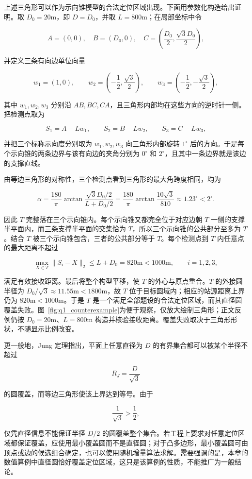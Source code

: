 上述三角形可以作为示向锥模型的合法定位区域出现。下面用参数化构造给出证明。取 $D_0=20\mathrm{m}$，即 $D=D_0$，并取 $L=800\mathrm{m}$；在局部坐标中令

\[
A=(0,0),\quad B=(D_0,0),\quad C=\left(\frac{D_0}{2},\frac{\sqrt3D_0}{2}\right),
\]

并定义三条有向边单位向量

\[
w_1=(1,0),\qquad
w_2=\left(-\frac12,\frac{\sqrt3}{2}\right),\qquad
w_3=\left(-\frac12,-\frac{\sqrt3}{2}\right),
\]

其中 $w_1,w_2,w_3$ 分别沿 $AB,BC,CA$，且三角形内部均在这些方向的逆时针一侧。把检测点取为

\[
S_1=A-Lw_1,\qquad S_2=B-Lw_2,\qquad S_3=C-Lw_3,
\]

并把三个标称示向度分别取为 $w_1,w_2,w_3$ 向三角形内部旋转 $1^\circ$ 后的方向。于是每个示向锥的两条边界与该有向边的夹角分别为 $0^\circ$ 和 $2^\circ$，且其中一条边界就是该边的支撑直线。

由等边三角形的对称性，三个检测点看到三角形的最大角跨度相同，均为

\[
\alpha=\frac{180}{\pi}\arctan\frac{\sqrt3D_0/2}{L+D_0/2}
=\frac{180}{\pi}\arctan\frac{10\sqrt3}{810}
\approx1.23^\circ<2^\circ.
\]

因此 $T$ 完整落在三个示向锥内。每个示向锥又都完全位于对应边朝 $T$ 一侧的支撑半平面内，而三条支撑半平面的交集恰为 $T$，所以三个示向锥的公共部分至多为 $T$。结合 $T$ 被三个示向锥包含，三者的公共部分等于 $T$。每个检测点到 $T$ 内任意点的最大距离不超过

\[
\max_{X\in T}\lVert S_i-X\rVert_2\le L+D_0
=820\mathrm{m}<1000\mathrm{m},\qquad i=1,2,3,
\]

满足有效接收距离。最后将整个构型平移，使 $T$ 的外心与原点重合。$T$ 的外接圆半径为 $D_0/\sqrt3\approx11.55\mathrm{m}<1800\mathrm{m}$，故 $T$ 位于目标圆域内；相应的站源距离上界仍为 $820\mathrm{m}<1000\mathrm{m}$。于是 $T$ 是一个满足全部题设的合法定位区域，而其直径圆覆盖失败。图~\ref{fig:q1_counterexample}为便于观察，仅放大绘制三角形；正文反例仍按 $D_0=20\mathrm{m}$、$L=800\mathrm{m}$ 构造并核验接收距离。覆盖失败取决于三角形形状，不随显示比例改变。

更一般地，Jung 定理指出，平面上任意直径为 $D$ 的有界集合都可以被某个半径不超过

\[
R_J=\frac{D}{\sqrt3}
\]

的圆覆盖，而等边三角形使该上界达到等号\cite{jung1901}。由于

\[
\frac{1}{\sqrt3}>\frac12,
\]

仅凭直径信息不能保证半径 $D/2$ 的圆覆盖整个集合。若工程上要求对任意定位区域都保证覆盖，应使用最小覆盖圆而不是直径圆；对于凸多边形，最小覆盖圆可由顶点或边的候选组合确定，也可以使用随机增量算法求解。需要强调的是，本章的数值算例中直径圆恰好覆盖定位区域，这只是该算例的性质，不能推广为一般结论。

